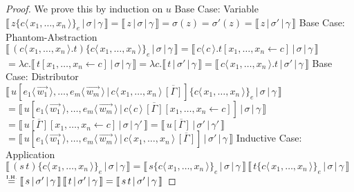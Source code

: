 \documentclass[a4paper,UKenglish,cleveref, autoref]{lipics-v2019}
\newcommand{\abs}[2]{\lambda #1 . #2}
\newcommand{\app}[2]{#1 \, #2}
\newcommand{\fake}[3]{#1 \langle \, #2 \, \rangle . #3}
\newcommand{\share}[3]{#1 [#2 \leftarrow #3]}
\newcommand{\dist}[5]{#1 [ #2 \, \vert \, \fakedist{#4}{#5} \, #3 ]}
\newcommand{\fakedist}[2]{#1 \langle \, #2 \, \rangle}
\newcommand{\exor}[3]{#1 \{ \fakedist{#2}{#3} \}_{e}}
\newcommand{\readbackwmap}[3]{\llbracket \, #1 \, \vert \, #2 \, \vert \, #3  \, \rrbracket }
\newcommand{\IH}{\stackrel{\hbox{\tiny I.H.}}{\hbox{=}}}
\begin{document}
\begin{proof}
We prove this by induction on $u$
\newline
\newline
Base Case: Variable
\newline
$\readbackwmap{z \exor{}{c}{x_{1}, \dots, x_{n}}}{\sigma}{\gamma} = \readbackwmap{z}{\sigma}{\gamma} = \sigma(z) = \sigma'(z) = \readbackwmap{z}{\sigma'}{\gamma}$
\newline
\newline
Base Case: Phantom-Abstraction
\newline
$\readbackwmap{(\fake{c}{x_{1}, \dots, x_{n}}{t})  \exor{}{c}{x_{1}, \dots, x_{n}} }{\sigma}{\gamma} = \readbackwmap{\fake{c}{c}{t \share{}{x_{1}, \dots, x_{n}}{c}}}{\sigma}{\gamma}$
\newline
$= \abs{c}{\readbackwmap{t \share{}{x_{1}, \dots, x_{n}}{c}}{\sigma}{\gamma}} = \abs{c}{\readbackwmap{t}{\sigma'}{\gamma}} = \readbackwmap{\fake{c}{x_{1}, \dots, x_{n}}{t}}{\sigma'}{\gamma}$
\newline
\newline
Base Case: Distributor
\newline
$\readbackwmap{\dist{u}{\fakedist{e_{1}}{\vec{w_{1}}}, \dots, \fakedist{e_{m}}{\vec{w_{m}}}}{\overline{[\Gamma]}}{c}{x_{1}, \dots, x_{n}} \exor{}{c}{x_{1}, \dots, x_{n}} }{\sigma}{\gamma}$
\newline
$= \readbackwmap{\dist{u}{\fakedist{e_{1}}{\vec{w_{1}}}, \dots, \fakedist{e_{m}}{\vec{w_{m}}}}{\overline{[\Gamma]} \share{}{x_{1}, \dots, x_{n}}{c}}{c}{c} }{\sigma}{\gamma}$
\newline
$= \readbackwmap{u \overline{[\Gamma]} \share{}{x_{1}, \dots, x_{n}}{c} }{\sigma}{\gamma'} = \readbackwmap{u \overline{[\Gamma]}}{\sigma'}{\gamma'}$
\newline
$= \readbackwmap{\dist{u}{\fakedist{e_{1}}{\vec{w_{1}}}, \dots, \fakedist{e_{m}}{\vec{w_{m}}}}{\overline{[\Gamma]}}{c}{x_{1}, \dots, x_{n}}}{\sigma'}{\gamma}$
\newline
\newline
Inductive Case: Application
\newline
$\readbackwmap{(\app{s}{t}) \exor{}{c}{x_{1}, \dots, x_{n}} }{\sigma}{\gamma} = \app{\readbackwmap{s \exor{}{c}{x_{1}, \dots, x_{n}}}{\sigma}{\gamma}}{\readbackwmap{t \exor{}{c}{x_{1}, \dots, x_{n}}}{\sigma}{\gamma}}$
\newline
$\IH \app{\readbackwmap{s}{\sigma'}{\gamma}}{\readbackwmap{t}{\sigma'}{\gamma}} = \readbackwmap{\app{s}{t}}{\sigma'}{\gamma}$
\newline

\end{proof}
\end{document}
